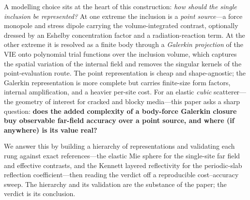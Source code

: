 \documentclass[11pt,a4paper]{article}
\theoremstyle{plain}
\theoremstyle{definition}
\theoremstyle{remark}
\begin{document}
A modelling choice sits at the heart of this construction: \emph{how should the
single inclusion be represented?}  At one extreme the inclusion is a
\emph{point source}---a force monopole and stress dipole carrying the
volume-integrated contrast, optionally dressed by an Eshelby concentration
factor \cite{eshelby1957} and a radiation-reaction term.  At the other extreme
it is resolved as a finite body through a \emph{Galerkin projection} of the VIE
onto polynomial trial functions over the inclusion volume, which captures the
spatial variation of the internal field and removes the singular kernels of the
point-evaluation route.  The point representation is cheap and shape-agnostic;
the Galerkin representation is more complete but carries finite-size form
factors, internal amplification, and a heavier per-site cost.  For an elastic
\emph{cubic} scatterer---the geometry of interest for cracked and blocky
media---this paper asks a sharp question: \textbf{does the added complexity of a
body-force Galerkin closure buy observable far-field accuracy over a point
source, and where (if anywhere) is its value real?}

We answer this by building a hierarchy of representations and validating each
rung against exact references---the elastic Mie sphere for the single-site far
field and effective contrasts, and the Kennett layered reflectivity for the
periodic-slab reflection coefficient---then reading the verdict off a
reproducible cost--accuracy sweep.  The hierarchy and its validation are the
substance of the paper; the verdict is its conclusion.
\end{document}
